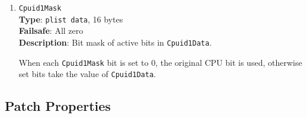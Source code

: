 \documentclass[]{article}
\begin{document}
\begin{enumerate}
\item
  \texttt{Cpuid1Mask}\\
  \textbf{Type}: \texttt{plist\ data}, 16 bytes\\
  \textbf{Failsafe}: All zero\\
  \textbf{Description}: Bit mask of active bits in \texttt{Cpuid1Data}.

  When each \texttt{Cpuid1Mask} bit is set to 0, the original CPU bit is used,
  otherwise set bits take the value of \texttt{Cpuid1Data}.

\end{enumerate}

\subsection{Patch Properties}\label{kernelpropspatch}
\end{document}

